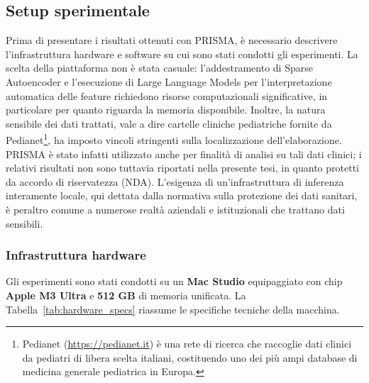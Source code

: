 \subsection{Setup sperimentale}
\label{subsec:setup}
Prima di presentare i risultati ottenuti con PRISMA, è necessario descrivere l'infrastruttura hardware e software su cui sono stati condotti gli esperimenti. La scelta della piattaforma non è stata casuale: l'addestramento di Sparse Autoencoder e l'esecuzione di Large Language Models per l'interpretazione automatica delle feature richiedono risorse computazionali significative, in particolare per quanto riguarda la memoria disponibile. 
Inoltre, la natura sensibile dei dati trattati, vale a dire cartelle cliniche pediatriche fornite da 
Pedianet\footnote{Pedianet (\url{https://pedianet.it}) è una rete di ricerca che raccoglie dati clinici da pediatri di libera scelta italiani, 
costituendo uno dei più ampi database di medicina generale pediatrica in Europa.
}, 
ha imposto 
vincoli stringenti sulla localizzazione dell'elaborazione. PRISMA è stato infatti utilizzato anche per finalità di analisi su tali dati clinici; i relativi risultati non sono tuttavia riportati nella presente tesi, in quanto protetti da accordo di riservatezza (NDA). L'esigenza di un'infrastruttura di inferenza interamente locale, qui dettata dalla normativa sulla protezione dei dati sanitari, è peraltro comune a numerose realtà aziendali e istituzionali che trattano dati sensibili.
\subsubsection{Infrastruttura hardware}
\label{subsubsec:hardware}
Gli esperimenti sono stati condotti su un \textbf{Mac Studio} equipaggiato con chip \textbf{Apple M3 Ultra}
e 
\textbf{512 GB} di memoria unificata. La Tabella~\ref{tab:hardware_specs} riassume le specifiche tecniche della macchina.

